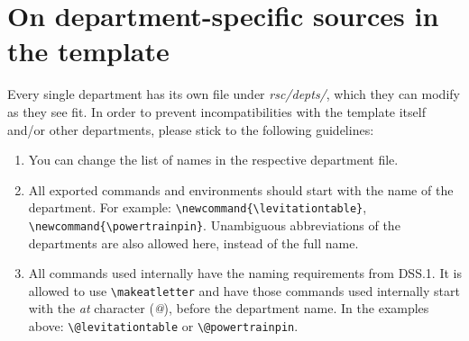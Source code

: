\section*{On department-specific sources in the template} \label{sec:deptartment-specific-sources}

Every single department has its own file under \textit{rsc/depts/}, which they can modify as they see fit. In order to prevent incompatibilities with the template itself and/or other departments, please stick to the following guidelines:

\begin{enumerate}[label=DSS.\arabic*]
    \item You can change the list of names in the respective department file. 
    \item All exported commands and environments should start with the name of the department. For example: \verb|\newcommand{\levitationtable}|, \verb|\newcommand{\powertrainpin}|. Unambiguous abbreviations of the departments are also allowed here, instead of the full name.
    \item All commands used internally have the naming requirements from DSS.1. It is allowed to use \verb|\makeatletter| and have those commands used internally start with the \textit{at} character (\textit{@}), before the department name. In the examples above: \verb|\@levitationtable| or \verb|\@powertrainpin|.
\end{enumerate}


